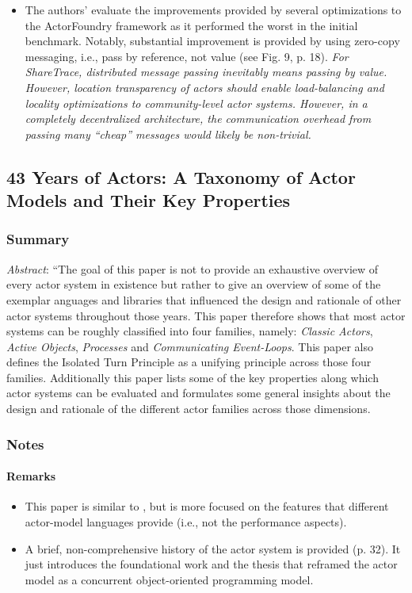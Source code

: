 \begin{itemize}
\begin{enumerate}
	\end{enumerate}
\item The authors' evaluate the improvements provided by several optimizations to the ActorFoundry framework as it performed the worst in the initial benchmark. Notably, substantial improvement is provided by using zero-copy messaging, i.e., pass by reference, not value (see Fig. 9, p. 18). \emph{For ShareTrace, distributed message passing inevitably means passing by value. However, location transparency of actors should enable load-balancing and locality optimizations to community-level actor systems. However, in a completely decentralized architecture, the communication overhead from passing many ``cheap'' messages would likely be non-trivial.}
\end{itemize}

\subsection{43 Years of Actors: A Taxonomy of Actor Models and Their Key Properties}
\subsubsection*{Summary}
\emph{Abstract}: ``The goal of this paper is not to provide an exhaustive overview of every actor system in existence but rather to give an overview of some of the exemplar anguages and libraries that influenced the design and rationale of other actor systems throughout those years. This paper therefore shows that most actor systems can be roughly classified into four families, namely: \emph{Classic Actors}, \emph{Active Objects}, \emph{Processes} and \emph{Communicating Event-Loops}. This paper also defines the Isolated Turn Principle as a unifying principle across those four families. Additionally this paper lists some of the key properties along which actor systems can be evaluated and formulates some general insights about the design and rationale of the different actor families across those dimensions.
\subsubsection*{Notes}
\paragraph{Remarks}
\begin{itemize}
\item This paper is similar to \cite{Karmani2009}, but is more focused on the features that different actor-model languages provide (i.e., not the performance aspects).
\item A brief, non-comprehensive history of the actor system is provided (p. 32). It just introduces the foundational work \cite{Hewitt1977b} and the thesis \cite{Agha1985} that reframed the actor model as a concurrent object-oriented programming model.
\end{itemize}

